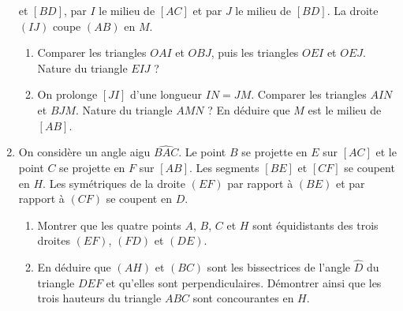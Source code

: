 \documentclass[12 pt]{report}
\theoremstyle{plain}
\newcounter{n}
\begin{document}
\begin{enumerate}
et $[BD]$, par $I$ le milieu de $[AC]$ et par $J$ le milieu de $[BD]$. La droite $(IJ)$ coupe $(AB)$ en $M$.
\begin{enumerate}
\item Comparer les triangles $OAI$ et $OBJ$, puis les triangles $OEI$ et $OEJ$. 
Nature du triangle $EIJ$ ? 
\item On prolonge $[JI]$ d'une longueur $IN=JM$. Comparer les triangles $AIN$ et $BJM$. Nature du triangle $AMN$ ? En déduire que $M$ est le milieu de $[AB]$. 
\end{enumerate}
\item On considère un angle aigu $\widehat{BAC}$. Le point $B$ se projette en $E$
sur $[AC]$ et le point $C$ se projette en $F$ sur $[AB]$. Les segments $[BE]$ et $[CF]$ se coupent en $H$. Les symétriques de la droite $(EF)$ par rapport à $(BE)$
et par rapport à $(CF)$ se coupent en $D$. 
\begin{enumerate}
\item Montrer que les quatre points $A$, $B$, $C$ et $H$ sont équidistants des trois droites $(EF)$, $(FD)$ et $(DE)$. 
\item En déduire que $(AH)$ et $(BC)$ sont les bissectrices de l'angle $\widehat{D}$ du triangle $DEF$ et qu'elles sont perpendiculaires. Démontrer ainsi que les trois 
hauteurs du triangle $ABC$ sont concourantes en $H$. 
\end{enumerate}
 \end{enumerate}
 
 
 
 
 	
\end{document}
